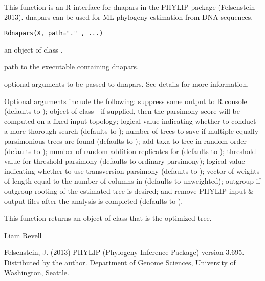 \documentclass[a4paper]{book}
\begin{document}
%
\begin{Description}\relax
This function is an R interface for dnapars in the PHYLIP package (Felsenstein 2013). dnapars can be used for ML phylogeny estimation from DNA sequences.
\end{Description}
%
\begin{Usage}
\begin{verbatim}
Rdnapars(X, path="." , ...)
\end{verbatim}
\end{Usage}
%
\begin{Arguments}
\begin{ldescription}
\item[\code{X}] an object of class .
\item[\code{path}] path to the executable containing dnapars.
\item[\code{...}] optional arguments to be passed to dnapars. See details for more information.
\end{ldescription}
\end{Arguments}
%
\begin{Details}\relax
Optional arguments include the following:  suppress some output to R console (defaults to );  object of class  - if supplied, then the parsimony score will be computed on a fixed input topology;  logical value indicating whether to conduct a more thorough search (defaults to );  number of trees to save if multiple equally parsimonious trees are found (defaults to );  add taxa to tree in random order (defaults to );  number of random addition replicates for  (defaults to );  threshold value for threshold parsimony (defaults to ordinary parsimony);  logical value indicating whether to use transversion parsimony (defaults to );  vector of weights of length equal to the number of columns in  (defaults to unweighted);  outgroup if outgroup rooting of the estimated tree is desired; and  remove PHYLIP input \& output files after the analysis is completed (defaults to ).   
\end{Details}
%
\begin{Value}
This function returns an object of class  that is the optimized tree.
\end{Value}
%
\begin{Author}\relax
Liam Revell 
\end{Author}
%
\begin{References}\relax
Felsenstein, J. (2013) PHYLIP (Phylogeny Inference Package) version 3.695. Distributed by the author. Department of Genome Sciences, University of Washington, Seattle.
\end{References}
%
\begin{SeeAlso}\relax
{}
\end{SeeAlso}
\printindex{}
\end{document}
